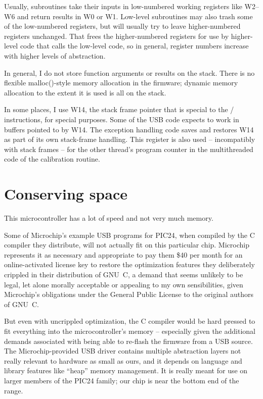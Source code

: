 Usually, subroutines take their inputs in low-numbered working registers
like W2--W6 and return results in W0 or W1.  Low-level subroutines may also
trash some of the low-numbered registers, but will usually try to leave
higher-numbered registers unchanged.  That frees the higher-numbered
registers for use by higher-level code that calls the low-level code, so in
general, register numbers increase with higher levels of abstraction.

In general, I do not store function arguments or results on the stack. 
There is no flexible malloc()-style memory allocation in the firmware;
dynamic memory allocation to the extent it is used is all on the stack.

In some places, I use W14, the stack frame pointer that is special to the
/ instructions, for special purposes.  Some of the USB
code expects to work in buffers pointed to by W14.  The exception handling
code saves and restores W14 as part of its own stack-frame handling.  This
register is also used -- incompatibly with stack frames -- for the other
thread's program counter in the multithreaded code of the calibration
routine.

\section{Conserving space}

This microcontroller has a lot of speed and not very much memory.

Some of Microchip's example USB programs for PIC24, when compiled by the C
compiler they distribute, will not actually fit on this particular chip. 
Microchip represents it as necessary and appropriate to pay them \$40 per
month for an online-activated license key to restore the optimization
features they deliberately crippled in their distribution of GNU~C, a demand
that seems unlikely to be legal, let alone morally acceptable or appealing
to my own sensibilities, given Microchip's obligations under the General
Public License to the original authors of GNU~C.

But even with uncrippled optimization, the C compiler would be hard pressed
to fit everything into the microcontroller's memory -- especially given the
additional demands associated with being able to re-flash the firmware from
a USB source.  The Microchip-provided USB driver contains multiple
abstraction layers not really relevant to hardware as small as ours, and it
depends on language and library features like ``heap'' memory management. 
It is really meant for use on larger members of the PIC24 family; our chip
is near the bottom end of the range.

